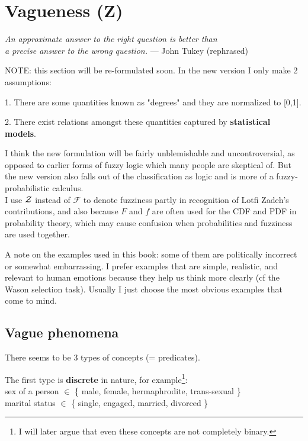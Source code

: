 \chapter{Vagueness (Z)}
\label{ch:vagueness}
\begin{flushright}
\emph{An approximate answer to the right question is better than\\
a precise answer to the wrong question.} --- John Tukey (rephrased)
\end{flushright}
\minitoc

NOTE:  this section will be re-formulated soon.  In the new version I only make 2 assumptions:

1. There are some quantities known as "degrees" and they are normalized to [0,1].

2. There exist relations amongst these quantities captured by \textbf{statistical models}.

I think the new formulation will be fairly unblemishable and uncontroversial, as opposed to earlier forms of fuzzy logic which many people are skeptical of.  But the new version also falls out of the classification as logic and is more of a fuzzy-probabilistic calculus.
\\

\footnotesize
I use $\mathcal{Z}$ instead of $\mathcal{F}$ to denote fuzziness partly in recognition of Lotfi Zadeh's contributions, and also because $F$ and $f$ are often used for the CDF and PDF in probability theory, which may cause confusion when probabilities and fuzziness are used together.

A note on the examples used in this book:  some of them are politically incorrect or somewhat embarrassing.  I prefer examples that are simple, realistic, and relevant to human emotions because they help us think more clearly (cf the Wason selection task).  Usually I just choose the most obvious examples that come to mind.
\normalsize

\section{Vague phenomena}

There seems to be 3 types of concepts (= predicates).

The first type is \textbf{discrete} in nature, for example\footnote{I will later argue that even these concepts are not completely binary.}:\\
\hspace*{1cm} sex of a person $\in$ \{ male, female, hermaphrodite, trans-sexual \}\\
\hspace*{1cm} marital status $\in$ \{ single, engaged, married, divorced \}

